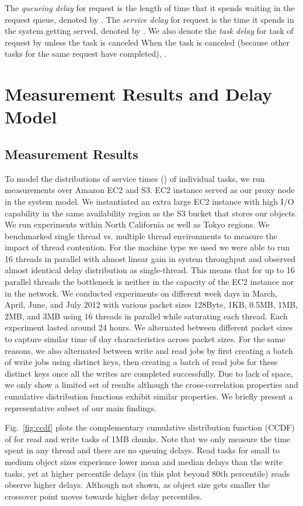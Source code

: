 \documentclass[journal]{IEEEtran}
\begin{document}
The {\em queueing delay} for request  is the length of time that it spends waiting in the request queue, denoted by . The {\em service delay} for request  is the time it spends in the system getting served, denoted by . 
We also denote the {\em task delay} for task  of request  by  unless the task is canceled When the task is canceled (because  other tasks for the same request have completed), .


\section{Measurement Results and Delay Model}
\label{sec:measurement}

\subsection{Measurement Results}
To model the distributions of service times () of individual tasks, we run measurements over Amazon EC2 and S3. EC2 instance served as our proxy node in the system model.  We instantiated an extra large EC2 instance with high I/O capability in the same availability region as the S3 bucket that stores our objects. We run experiments within North California as well as Tokyo regions. We benchmarked single thread vs. multiple thread environments to measure the impact of thread contention. For the machine type we used we were able to run 16 threads in parallel with almost linear gain in system throughput and observed almost identical delay distribution as single-thread. This means that for up to 16 parallel threads the bottleneck is neither in the capacity of the EC2 instance nor in the network. We conducted experiments on different week days in March, April, June, and July 2012 with various packet sizes 128Byte, 1KB, 0.5MB, 1MB, 2MB, and 3MB using 16 threads in parallel while saturating each thread. Each experiment lasted around 24 hours. We alternated between different packet sizes to capture similar time of day characteristics across packet sizes. For the same reasons, we also alternated between write and read jobs by first creating a batch of write jobs using distinct keys, then creating a batch of read jobs for these distinct keys once all the writes are completed successfully. Due to lack of space, we only show a limited set of results although the cross-correlation properties and cumulative distribution functions exhibit similar properties. We briefly present a representative subset of our main findings.  

Fig.~\ref{fig:ccdf} plots the complementary cumulative distribution function (CCDF) of  for read and write  tasks of 1MB chunks. Note that we only measure the time spent in any thread and there are no queuing delays. Read tasks for small to medium object sizes experience lower mean and median delays than the write tasks, yet at higher percentile delays (in this plot beyond 80th percentile) reads observe higher delays. Although not shown, as object size gets smaller the crossover point moves towards higher delay percentiles.
\end{document}
